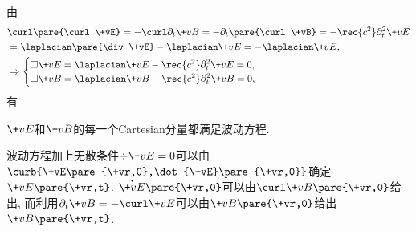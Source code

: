 \documentclass[hidelinks]{ctexart}
\begin{document}
由
\begin{align*}
    & \curl\pare{\curl \+vE} = -\curl \partial_t \+vB = -\partial_t \pare{\curl \+vB} = -\rec{c^2}\partial_t^2 \+vE \\
    & = \laplacian \pare{\div \+vE} - \laplacian \+vE = -\laplacian \+vE, \\
    & \Rightarrow \begin{cases}
        \displaystyle \Box \+vE = \laplacian \+vE - \rec{c^2}\partial_t^2 \+vE = 0, \\
        \displaystyle \Box \+vB = \laplacian \+vB - \rec{c^2}\partial_t^2 \+vB = 0,
    \end{cases}
\end{align*}
有
\begin{cenum}
    \item $\+vE$和$\+vB$的每一个Cartesian分量都满足波动方程.
    \item 波动方程加上无散条件$\div \+vE = 0$可以由$\curb{\+vE\pare{\+vr,0},\dot{\+vE}\pare{\+vr,0}}$确定$\+vE\pare{\+vr,t}$. $\dot{\+vE}\pare{\+vr,0}$可以由$\curl \+vB\pare{\+vr,0}$给出, 而利用$\partial_t \+vB = -\curl \+vE$可以由$\+vB\pare{\+vr,0}$给出$\+vB\pare{\+vr,t}$.
\end{cenum}
\end{document}
